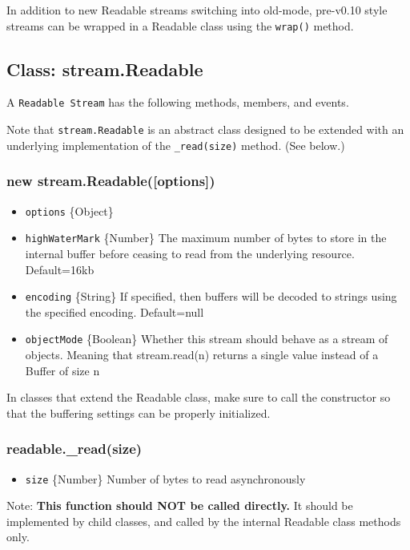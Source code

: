 In addition to new Readable streams switching into old-mode, pre-v0.10
style streams can be wrapped in a Readable class using the
\texttt{wrap()} method.

\subsection{Class: stream.Readable}

A \texttt{Readable Stream} has the following methods, members, and
events.

Note that \texttt{stream.Readable} is an abstract class designed to be
extended with an underlying implementation of the \texttt{\_read(size)}
method. (See below.)

\subsubsection{new stream.Readable({[}options{]})}

\begin{itemize}
\item
  \texttt{options} \{Object\}
\item
  \texttt{highWaterMark} \{Number\} The maximum number of bytes to store
  in the internal buffer before ceasing to read from the underlying
  resource. Default=16kb
\item
  \texttt{encoding} \{String\} If specified, then buffers will be
  decoded to strings using the specified encoding. Default=null
\item
  \texttt{objectMode} \{Boolean\} Whether this stream should behave as a
  stream of objects. Meaning that stream.read(n) returns a single value
  instead of a Buffer of size n
\end{itemize}

In classes that extend the Readable class, make sure to call the
constructor so that the buffering settings can be properly initialized.

\subsubsection{readable.\_read(size)}

\begin{itemize}
\item
  \texttt{size} \{Number\} Number of bytes to read asynchronously
\end{itemize}

Note: \textbf{This function should NOT be called directly.} It should be
implemented by child classes, and called by the internal Readable class
methods only.

